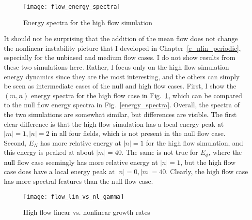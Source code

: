 \begin{figure}
\centerline{\texttt{[image: flow\_energy\_spectra]}}
\caption{Energy spectra for the high flow simulation}
\label{flow_energy_spectra}
\end{figure}

It should not be surprising that the addition of the mean flow does not change the nonlinear instability picture that I developed in Chapter~\ref{c_nlin_periodic}, especially for the unbiased
and medium flow cases. I do not show results from these two simulations here. Rather, I focus only on the high flow simulation energy dynamics since they are the most interesting,
and the others can simply be seen as intermediate cases of the null and high flow cases. First, I show the $(m,n)$ energy spectra for the high flow case in Fig.~\ref{flow_energy_spectra},
which can be compared to the null flow energy spectra in Fig.~\ref{energy_spectra}. Overall, the spectra of the two simulations are somewhat similar, but differences are visible.
The first clear difference is that the high flow simulation has a local energy peak at $|m|=1,|n|=2$ in all four fields, which is not present in the null flow case. 
Second, $E_N$ has more relative energy at $|n|=1$ for the high flow simulation, and this energy
is peaked at about $|m|=40$. The same is not true for $E_\phi$, where the null flow case seemingly has more relative energy at $|n|=1$, but the high flow case does have a local energy peak at
$|n|=0,|m|=40$. Clearly, the high flow case has more spectral features than the null flow case.

\begin{figure}
\centerline{\texttt{[image: flow\_lin\_vs\_nl\_gamma]}}
\caption{High flow linear vs. nonlinear growth rates}
\label{flow_lin_vs_nl_gamma}
\end{figure}

